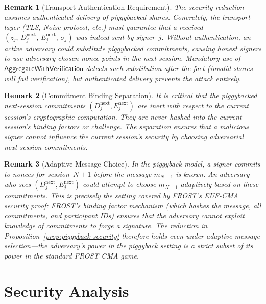 \documentclass[11pt,a4paper]{article}
\newtheorem{remark}{Remark}[section]
\begin{document}
\begin{remark}[Transport Authentication Requirement]
  \label{rem:transport-auth}
  The security reduction assumes \emph{authenticated delivery} of piggybacked
  shares.  Concretely, the transport layer (TLS, Noise protocol, etc.) must
  guarantee that a received $(z_j,\, D_j^{\mathrm{next}},\,
  E_j^{\mathrm{next}},\, \sigma_j)$ was indeed sent by signer~$j$.
  Without authentication, an active adversary could substitute piggybacked
  commitments, causing honest signers to use adversary-chosen nonce points in
  the next session.  Mandatory use of $\mathsf{AggregateWithVerification}$
  detects such substitution \emph{after the fact} (invalid shares will fail
  verification), but authenticated delivery prevents the attack entirely.
\end{remark}

\begin{remark}[Commitment Binding Separation]
  \label{rem:binding-separation}
  It is critical that the piggybacked next-session commitments
  $(D_j^{\mathrm{next}}, E_j^{\mathrm{next}})$ are \emph{inert} with respect
  to the current session's cryptographic computation.  They are never hashed
  into the current session's binding factors or challenge.  The separation
  ensures that a malicious signer cannot influence the current session's
  security by choosing adversarial next-session commitments.
\end{remark}

\begin{remark}[Adaptive Message Choice]
  \label{rem:adaptive-msg}
  In the piggyback model, a signer commits to nonces for session~$N{+}1$
  \emph{before} the message $m_{N+1}$ is known. An adversary who sees
  $(D_j^{\mathrm{next}}, E_j^{\mathrm{next}})$ could attempt to choose
  $m_{N+1}$ adaptively based on these commitments. This is precisely the
  setting covered by FROST's EUF-CMA security proof: FROST's binding factor
  mechanism (which hashes the message, all commitments, and participant IDs)
  ensures that the adversary cannot exploit knowledge of commitments to forge
  a signature. The reduction in Proposition~\ref{prop:piggyback-security}
  therefore holds even under adaptive message selection---the adversary's
  power in the piggyback setting is a strict subset of its power in the
  standard FROST CMA game.
\end{remark}

\section{Security Analysis}
\label{sec:security}
\end{document}
